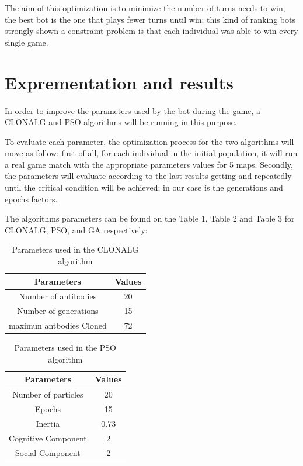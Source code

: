 \documentclass[]{interact}
\theoremstyle{plain}%
\theoremstyle{definition}
\theoremstyle{remark}
\begin{document}
The aim of this optimization is to minimize the number of turns needs to win, the best bot is the one that plays fewer turns until win; this kind of ranking bots strongly shown a constraint problem is that each individual was able to win every single game.\\

\section{Exprementation and results}
In order to improve the parameters used by the bot during the game, a CLONALG and PSO algorithms will be running in this purpose. 

To evaluate each parameter, the optimization process for the two algorithms will move as follow: 
first of all, for each individual in the initial population, it will run a real game match with the appropriate parameters values for 5 maps. Secondly, the parameters will evaluate according to the last results getting and repeatedly until the critical condition will be achieved; in our case is the generations and epochs factors.\\

\par The algorithms parameters can be found on the Table 1, Table 2 and Table 3 for CLONALG, PSO, and GA respectively:
\begin{table}[h!]
\centering
\begin{tabular}{ |c|c| }
\hline
 Parameters & Values \\ 
\hline
 Number of antibodies & 20 \\ 
 Number of generations & 15 \\  
 maximun antbodies Cloned & 72 \\ 
 \hline   
\end{tabular}
\centering
\caption{Parameters used in the CLONALG algorithm}
\label{TABLE 1}
\end{table}

\begin{table}[h!]
\centering
\begin{tabular}{ |c|c| }
\hline
 Parameters & Values \\ 
\hline
 Number of particles & 20 \\ 
 Epochs & 15 \\  
 Inertia & 0.73 \\
 Cognitive Component & 2 \\
 Social Component & 2 \\ 
 \hline   
\end{tabular}
\caption{Parameters used in the PSO algorithm}
\label{TABLE 2}
\end{table}
\end{document}
